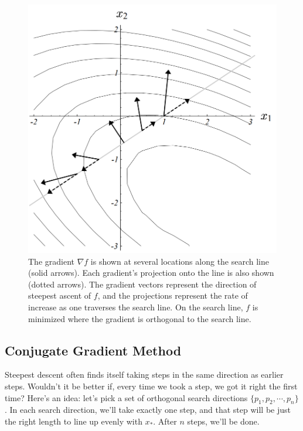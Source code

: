 \documentclass{article}
\begin{document}
\begin{figure}[H]
   \centering
   \includegraphics[scale=0.3]{figure/search_line.png}
   \caption{The gradient $\nabla f$ is shown at several locations along the search line (solid arrows). Each gradient’s projection onto the line is also shown (dotted arrows). The gradient vectors represent the direction of steepest ascent of $f$, and the projections represent the rate of increase as one traverses the search line. On the search line, $f$ is minimized where the gradient is orthogonal to the search line.}
   \label{fig:searchline}
\end{figure}

\subsection{Conjugate Gradient Method}

Steepest descent often finds itself taking steps in the same direction as earlier steps.  Wouldn’t it be better if, every time we took a step, we got it right the first time? Here’s an idea: let’s pick a set of orthogonal search directions $\{ p_1,  p_2,\cdots, p_n\}$. In each search direction, we’ll take exactly one step, and that step will be just the right length to line up evenly with $x_*$. After $n$ steps, we’ll be done.
\end{document}
